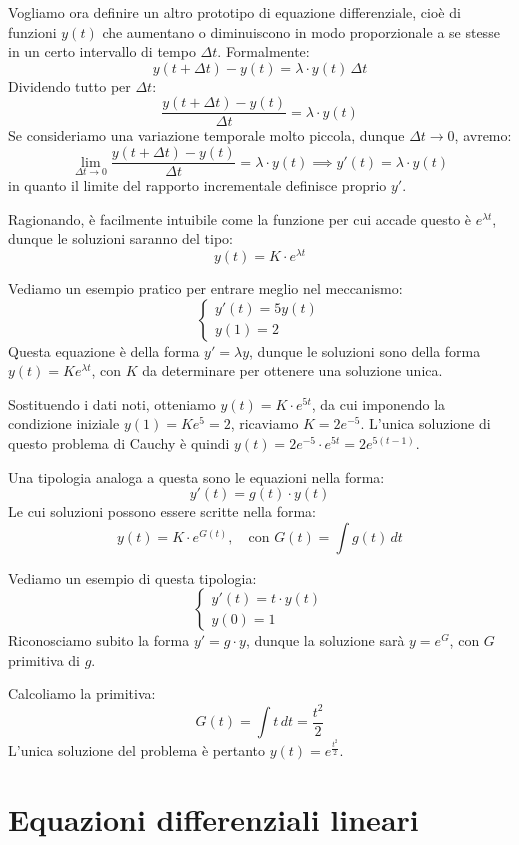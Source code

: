 \documentclass[12pt]{report}
\begin{document}
	Vogliamo ora definire un altro prototipo di equazione differenziale, cioè di funzioni $y(t)$ che aumentano o diminuiscono in modo proporzionale a se stesse in un certo intervallo di tempo $\Delta t$. Formalmente:
	\[
	y(t + \Delta t) - y(t) = \lambda \cdot y(t) \, \Delta t
	\]
	Dividendo tutto per $\Delta t$:
	\[
	\frac{y(t + \Delta t) - y(t)}{\Delta t} = \lambda \cdot y(t)
	\]
	Se consideriamo una variazione temporale molto piccola, dunque $\Delta t \to 0$, avremo:
	\[
	\lim_{\Delta t \to 0} \frac{y(t + \Delta t) - y(t)}{\Delta t} = \lambda \cdot y(t) \implies y'(t) = \lambda \cdot y(t)
	\]
	in quanto il limite del rapporto incrementale definisce proprio $y'$.
	
	Ragionando, è facilmente intuibile come la funzione per cui accade questo è $e^{\lambda t}$, dunque le soluzioni saranno del tipo:
	\[
	y(t) = K \cdot e^{\lambda t}
	\]
	
	Vediamo un esempio pratico per entrare meglio nel meccanismo:
	\[
	\begin{cases}
		y'(t) = 5y(t) \\
		y(1) = 2
	\end{cases}
	\]
	Questa equazione è della forma $y' = \lambda y$, dunque le soluzioni sono della forma $y(t) = K e^{\lambda t}$, con $K$ da determinare per ottenere una soluzione unica.
	
	Sostituendo i dati noti, otteniamo $y(t) = K \cdot e^{5t}$, da cui imponendo la condizione iniziale $y(1) = K e^5 = 2$, ricaviamo $K = 2e^{-5}$.
	L'unica soluzione di questo problema di Cauchy è quindi $y(t) = 2e^{-5} \cdot e^{5t} = 2e^{5(t-1)}$.
	
	Una tipologia analoga a questa sono le equazioni nella forma:
	\[
	y'(t) = g(t) \cdot y(t)
	\]
	Le cui soluzioni possono essere scritte nella forma:
	\[
	y(t) = K \cdot e^{G(t)}, \quad \text{con } G(t) = \int g(t) \, dt
	\]
	
	Vediamo un esempio di questa tipologia:
	\[
	\begin{cases}
		y'(t) = t \cdot y(t) \\
		y(0) = 1
	\end{cases}
	\]
	Riconosciamo subito la forma $y' = g \cdot y$, dunque la soluzione sarà $y = e^G$, con $G$ primitiva di $g$.
	
	Calcoliamo la primitiva:
	\[
	G(t) = \int t \, dt = \frac{t^2}{2}
	\]
	L'unica soluzione del problema è pertanto $y(t) = e^{\frac{t^2}{2}}$.
	
	\section{Equazioni differenziali lineari}
	
\end{document}
